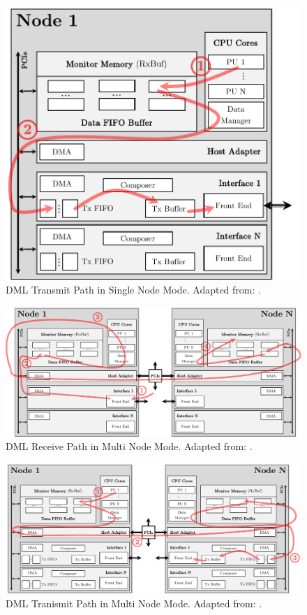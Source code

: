\vspace{20pt}

\begin{figure}[!htbp]
    \centering
    \includegraphics[width=0.65\linewidth]{figures/dml/dml03a.pdf}
    \caption[DML Transmit Path in Single Node Mode]{DML Transmit Path in Single Node Mode. Adapted from: \cite{dml01}.}
    \label{fig:DmlTransSingleNode}
\end{figure}

\begin{figure}
    \centering
    \includegraphics[width=1\linewidth]{figures/dml/dml02b.pdf}
    \caption[DML Receive Path in Multi Node Mode]{DML Receive Path in Multi Node Mode. Adapted from: \cite{dml01}.}
    \label{fig:DmlRecMultiNode}
\end{figure}

\begin{figure}
    \centering
    \includegraphics[width=1\linewidth]{figures/dml/dml03b.pdf}
    \caption[DML Transmit Path in Multi Node Mode]{DML Tranismit Path in Multi Node Mode. Adapted from: \cite{dml01}.}
    \label{fig:DmlTransMultiNode}
\end{figure}

